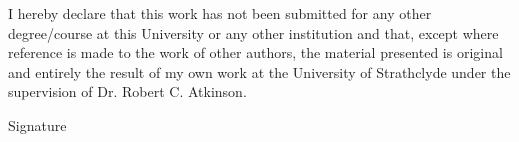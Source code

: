 \vspace*{\fill}
I hereby declare that this work has not been submitted for any other degree/course at this University or any other institution and that, except where reference is made to the work of other authors, the material presented is original and entirely the result of my own work at the University of Strathclyde under the supervision of Dr. Robert C. Atkinson.

\begin{center}
Signature\hspace{0.5cm} \makebox[1.5in]{\hrulefill}
\end{center}
\vspace*{\fill}